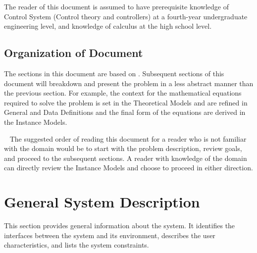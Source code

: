 \documentclass[12pt]{article}
\begin{document}
The reader of this document is assumed to have prerequisite knowledge of 
Control System (Control theory and controllers) at a fourth-year undergraduate 
engineering level, and knowledge of calculus at the high school level. 

\subsection{Organization of Document}


The sections in this document are based on \citet{SmithAndLai2005, 
SmithEtAl2007}. Subsequent sections of this document will breakdown and present 
the problem in a less abstract manner than the previous section. 
For example, the context for the mathematical equations required to solve the 
problem is set in the Theoretical Models and are refined in General and Data 
Definitions and the final form of the equations are derived in the Instance 
Models. 

~\newline
The suggested order of reading this document for a reader who is not familiar 
with the domain would be to start with the problem description, review goals, 
and proceed to the subsequent sections. A reader with knowledge of the domain 
can directly review the Instance Models and choose to proceed in either direction.

\section{General System Description}

This section provides general information about the system. It identifies the
interfaces between the system and its environment, describes the user
characteristics, and lists the system constraints.  

\end{document}
